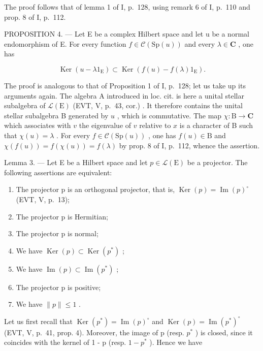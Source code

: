 The proof follows that of lemma 1 of I, p.~128, using remark 6 of I, p.~110 and prop. 8 of I, p.~112.

PROPOSITION 4. --- Let E be a complex Hilbert space and let u be a normal endomorphism of E. For every function \(f \in \mathcal{C}(\mathrm{Sp}(u))\) and every \(\lambda \in \mathbf{C}\) , one has

\[
\operatorname{Ker} (u - \lambda 1 _ {\mathrm{E}}) \subset \operatorname{Ker} (f (u) - f (\lambda) 1 _ {\mathrm{E}}).
\]

The proof is analogous to that of Proposition 1 of I, p.~128; let us take up its arguments again. The algebra A introduced in loc. cit. is here a unital stellar subalgebra of \(\mathcal{L}(\mathrm{E})\) (EVT, V, p.~43, cor.) . It therefore contains the unital stellar subalgebra B generated by \(u\) , which is commutative. The map \(\chi: \mathrm{B} \to \mathbf{C}\) which associates with \(v\) the eigenvalue of \(v\) relative to \(x\) is a character of B such that \(\chi(u) = \lambda\) . For every \(f \in \mathcal{C}(\mathrm{Sp}(u))\) , one has \(f(u) \in \mathrm{B}\) and \(\chi(f(u)) = f(\chi(u)) = f(\lambda)\) by prop. 8 of I, p.~112, whence the assertion.

Lemma 3. --- Let E be a Hilbert space and let \(p \in \mathcal{L}(\mathrm{E})\) be a projector. The following assertions are equivalent:

\begin{enumerate}
\def\labelenumi{(\roman{enumi})}
\item
  The projector p is an orthogonal projector, that is, \(\operatorname{Ker}(p)=\operatorname{Im}(p)^{\circ}\) (EVT, V, p.~13);
\item
  The projector p is Hermitian;
\item
  The projector p is normal;
\item
  We have \(\operatorname{Ker}(p) \subset \operatorname{Ker}(p^*)\) ;
\item
  We have \(\operatorname{Im}(p) \subset \operatorname{Im}(p^*)\) ;
\item
  The projector p is positive;
\item
  We have \(\| p\| \leqslant 1\) .
\end{enumerate}

Let us first recall that \(\operatorname{Ker}(p^{*}) = \operatorname{Im}(p)^{\circ}\) and \(\operatorname{Ker}(p) = \operatorname{Im}(p^{*})^{\circ}\) (EVT, V, p.~41, prop. 4). Moreover, the image of p (resp. \(p^{*}\) ) is closed, since it coincides with the kernel of 1 - p (resp. \(1 - p^{*}\) ). Hence we have

